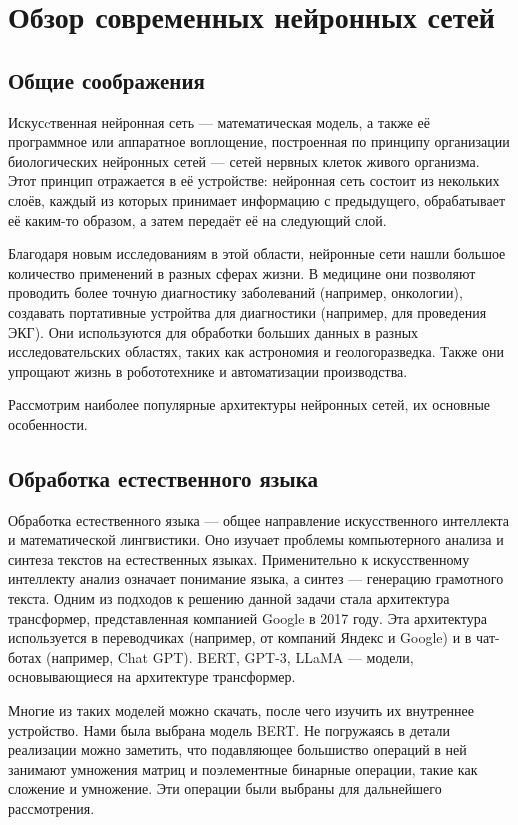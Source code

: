 \section{Обзор современных нейронных сетей}
\label{sec:Chapter2} 

\subsection{Общие соображения}

Искусcтвенная нейронная сеть --- математическая модель, а также её программное или
аппаратное воплощение, построенная по принципу организации биологических нейронных
сетей --- сетей нервных клеток живого организма. Этот принцип отражается в её
устройстве: нейронная сеть состоит из некольких слоёв, каждый из которых принимает
информацию с предыдущего, обрабатывает её каким-то образом, а  затем передаёт её
на следующий слой.

Благодаря новым исследованиям в этой области, нейронные сети нашли большое
количество применений в разных сферах жизни. В медицине они позволяют проводить
более точную диагностику заболеваний (например, онкологии), создавать портативные
устройтва для диагностики (например, для проведения ЭКГ). Они используются
для обработки больших данных в разных исследовательских областях, таких как
астрономия и геологоразведка. Также они упрощают жизнь в робототехнике и
автоматизации производства.

Рассмотрим наиболее популярные архитектуры нейронных сетей, их основные особенности.

\subsection{Обработка естественного языка}

Обработка естественного языка --- общее направление искусственного интеллекта и
математической лингвистики. Оно изучает проблемы компьютерного анализа и синтеза
текстов на естественных языках. Применительно к искусственному интеллекту анализ
означает понимание языка, а синтез --- генерацию грамотного текста. Одним из
подходов к решению данной задачи стала архитектура трансформер, представленная
компанией Google в 2017 году. Эта архитектура используется в переводчиках
(например, от компаний Яндекс и Google) и в чат-ботах (например, Chat GPT).
BERT, GPT-3, LLaMA --- модели, основывающиеся на архитектуре трансформер.

Многие из таких моделей можно скачать, после чего изучить их внутреннее
устройство. Нами была выбрана модель BERT. Не погружаясь в детали реализации
можно заметить, что подавляющее большиство операций в ней занимают
умножения матриц и поэлементные бинарные операции, такие как сложение и
умножение. Эти операции были выбраны для дальнейшего рассмотрения.


